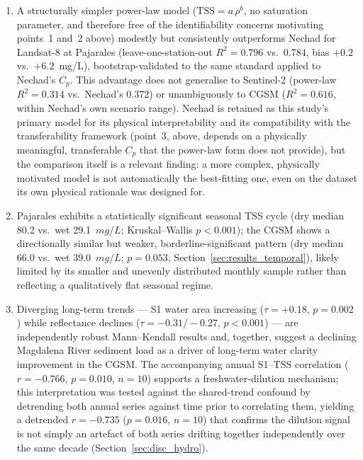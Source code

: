 \documentclass[remotesensing,article,submit,pdftex,moreauthors]{Definitions/mdpi}
\begin{document}
\begin{enumerate}
    \item A structurally simpler power-law model
    ($\text{TSS} = a\,\rho^b$, no saturation parameter, and therefore
    free of the identifiability concerns motivating points~1 and~2
    above) modestly but consistently outperforms Nechad for Landsat-8
    at Pajarales (leave-one-station-out $R^2 = 0.796$ vs.\ $0.784$,
    bias $+0.2$ vs.\ $+6.2$~mg/L), bootstrap-validated to the same
    standard applied to Nechad's $C_p$. This advantage does not
    generalise to Sentinel-2 (power-law $R^2 = 0.314$ vs.\ Nechad's
    $0.372$) or unambiguously to CGSM ($R^2 = 0.616$, within Nechad's
    own scenario range). Nechad is retained as this study's primary
    model for its physical interpretability and its compatibility with
    the transferability framework (point~3, above, depends on a
    physically meaningful, transferable $C_p$ that the power-law form
    does not provide), but the comparison itself is a relevant
    finding: a more complex, physically motivated model is not
    automatically the best-fitting one, even on the dataset its own
    physical rationale was designed for.
 
    \item Pajarales exhibits a statistically significant seasonal TSS
    cycle (dry median 80.2 vs.\ wet 29.1~$mg/L$;
    Kruskal--Wallis $p < 0.001$); the CGSM shows a directionally
    similar but weaker, borderline-significant pattern
    (dry median 66.0 vs.\ wet 39.0~$mg/L$; $p = 0.053$,
    Section~\ref{sec:results_temporal}), likely limited by its smaller
    and unevenly distributed monthly sample rather than reflecting a
    qualitatively flat seasonal regime.
 
    \item Diverging long-term trends --- S1 water area increasing
    ($\tau = +0.18$, $p = 0.002$) while reflectance declines
    ($\tau = -0.31/-0.27$, $p < 0.001$) --- are independently robust
    Mann--Kendall results and, together, suggest a declining Magdalena
    River sediment load as a driver of long-term water clarity
    improvement in the CGSM. The accompanying annual S1--TSS
    correlation ($r = -0.766$, $p = 0.010$, $n=10$) supports a
    freshwater-dilution mechanism; this interpretation was tested
    against the shared-trend confound by detrending both annual series
    against time prior to correlating them, yielding a detrended
    $r = -0.735$ ($p = 0.016$, $n=10$) that confirms the dilution
    signal is not simply an artefact of both series drifting together
    independently over the same decade (Section~\ref{sec:disc_hydro}).
 

\end{enumerate}
\end{document}
